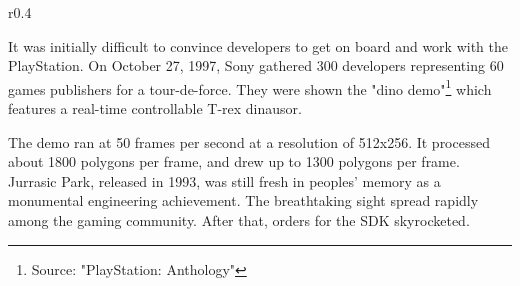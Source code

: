 \par
\begin{wrapfigure}[10]{r}{0.4\textwidth}{
\centering {}}
\end{wrapfigure}
It was initially difficult to convince developers to get on board and work with the PlayStation. On October 27, 1997, Sony gathered 300 developers representing 60 games publishers for a tour-de-force. They were shown the "dino demo"\footnote{Source: "PlayStation: Anthology"} which features a real-time controllable T-rex dinausor.\\
\par The demo ran at 50 frames per second at a resolution of 512x256. It processed about 1800 polygons per frame, and drew up to 1300 polygons per frame. Jurrasic Park, released in 1993, was still fresh in peoples' memory as a monumental engineering achievement. The breathtaking sight spread rapidly among the gaming community. After that, orders for the SDK skyrocketed.
 
 







